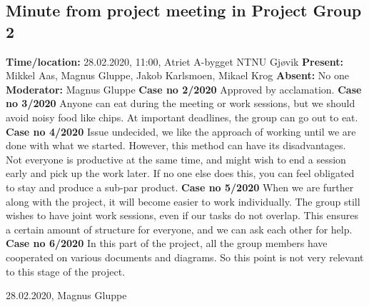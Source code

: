 \documentclass{article}
\begin{document}
\subsection{Minute from project meeting in Project Group 2}
\newline
\textbf{Time/location:} 28.02.2020, 11:00, Atriet A-bygget NTNU Gjøvik
\newline
\textbf{Present: }Mikkel Aas, Magnus Gluppe, Jakob Karlsmoen, Mikael Krog
\newline
\textbf{Absent:} No one
\newline
\textbf{Moderator:} Magnus Gluppe
 \newline \newline
\textbf{Case no 2/2020} \newline
Approved by acclamation.  \newline  \newline
\textbf{Case no 3/2020}  \newline
Anyone can eat during the meeting or work sessions, but we should avoid noisy food like chips. At important deadlines, the group can go out to eat. \newline  \newline
\textbf{Case no 4/2020}  \newline
Issue undecided, we like the approach of working until we are done with what we started. However, this method can have its disadvantages. Not everyone is productive at the same time, and might wish to end a session early and pick up the work later. If no one else does this, you can feel obligated to stay and produce a sub-par product.  \newline  \newline
\textbf{Case no 5/2020}  \newline
When we are further along with the project, it will become easier to work individually. The group still wishes to have joint work sessions, even if our tasks do not overlap. This ensures a certain amount of structure for everyone, and we can ask each other for help.  \newline  \newline
\textbf{Case no 6/2020}  \newline
In this part of the project, all the group members have cooperated on various documents and diagrams. So this point is not very relevant to this stage of the project. 

\begin{flushright}28.02.2020, Magnus Gluppe\end{flushright}
\end{document}
